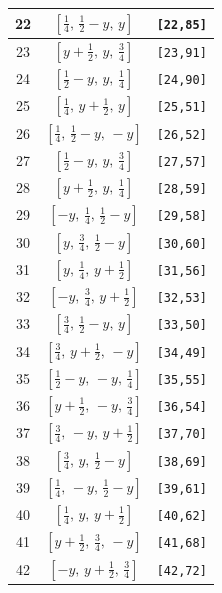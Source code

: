 \documentclass[fleqn,8pt]{jsarticle}
\begin{document}
\begin{longtable}{ccc}
22 & $\left[ \frac{1}{4},\, \frac{1}{2} - y,\, y \right]$ & {\tt [22,85]} \\ \hline
23 & $\left[ y + \frac{1}{2},\, y,\, \frac{3}{4} \right]$ & {\tt [23,91]} \\ \hline
24 & $\left[ \frac{1}{2} - y,\, y,\, \frac{1}{4} \right]$ & {\tt [24,90]} \\ \hline
25 & $\left[ \frac{1}{4},\, y + \frac{1}{2},\, y \right]$ & {\tt [25,51]} \\ \hline
26 & $\left[ \frac{1}{4},\, \frac{1}{2} - y,\, - y \right]$ & {\tt [26,52]} \\ \hline
27 & $\left[ \frac{1}{2} - y,\, y,\, \frac{3}{4} \right]$ & {\tt [27,57]} \\ \hline
28 & $\left[ y + \frac{1}{2},\, y,\, \frac{1}{4} \right]$ & {\tt [28,59]} \\ \hline
29 & $\left[ - y,\, \frac{1}{4},\, \frac{1}{2} - y \right]$ & {\tt [29,58]} \\ \hline
30 & $\left[ y,\, \frac{3}{4},\, \frac{1}{2} - y \right]$ & {\tt [30,60]} \\ \hline
31 & $\left[ y,\, \frac{1}{4},\, y + \frac{1}{2} \right]$ & {\tt [31,56]} \\ \hline
32 & $\left[ - y,\, \frac{3}{4},\, y + \frac{1}{2} \right]$ & {\tt [32,53]} \\ \hline
33 & $\left[ \frac{3}{4},\, \frac{1}{2} - y,\, y \right]$ & {\tt [33,50]} \\ \hline
34 & $\left[ \frac{3}{4},\, y + \frac{1}{2},\, - y \right]$ & {\tt [34,49]} \\ \hline
35 & $\left[ \frac{1}{2} - y,\, - y,\, \frac{1}{4} \right]$ & {\tt [35,55]} \\ \hline
36 & $\left[ y + \frac{1}{2},\, - y,\, \frac{3}{4} \right]$ & {\tt [36,54]} \\ \hline
37 & $\left[ \frac{3}{4},\, - y,\, y + \frac{1}{2} \right]$ & {\tt [37,70]} \\ \hline
38 & $\left[ \frac{3}{4},\, y,\, \frac{1}{2} - y \right]$ & {\tt [38,69]} \\ \hline
39 & $\left[ \frac{1}{4},\, - y,\, \frac{1}{2} - y \right]$ & {\tt [39,61]} \\ \hline
40 & $\left[ \frac{1}{4},\, y,\, y + \frac{1}{2} \right]$ & {\tt [40,62]} \\ \hline
41 & $\left[ y + \frac{1}{2},\, \frac{3}{4},\, - y \right]$ & {\tt [41,68]} \\ \hline
42 & $\left[ - y,\, y + \frac{1}{2},\, \frac{3}{4} \right]$ & {\tt [42,72]} \\ \hline

\end{longtable}
\end{document}
